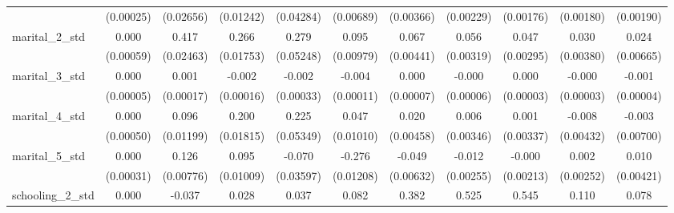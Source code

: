 {\begin{tabular}{l*{10}{c}}
                    &   (0.00025)         &   (0.02656)         &   (0.01242)         &   (0.04284)         &   (0.00689)         &   (0.00366)         &   (0.00229)         &   (0.00176)         &   (0.00180)         &   (0.00190)         \\
marital\_2\_std       &       0.000         &       0.417\sym{***}&       0.266\sym{***}&       0.279\sym{***}&       0.095\sym{***}&       0.067\sym{***}&       0.056\sym{***}&       0.047\sym{***}&       0.030\sym{***}&       0.024\sym{***}\\
                    &   (0.00059)         &   (0.02463)         &   (0.01753)         &   (0.05248)         &   (0.00979)         &   (0.00441)         &   (0.00319)         &   (0.00295)         &   (0.00380)         &   (0.00665)         \\
marital\_3\_std       &       0.000         &       0.001\sym{***}&      -0.002\sym{***}&      -0.002\sym{***}&      -0.004\sym{***}&       0.000\sym{*}  &      -0.000         &       0.000         &      -0.000\sym{***}&      -0.001\sym{***}\\
                    &   (0.00005)         &   (0.00017)         &   (0.00016)         &   (0.00033)         &   (0.00011)         &   (0.00007)         &   (0.00006)         &   (0.00003)         &   (0.00003)         &   (0.00004)         \\
marital\_4\_std       &       0.000         &       0.096\sym{***}&       0.200\sym{***}&       0.225\sym{***}&       0.047\sym{***}&       0.020\sym{***}&       0.006         &       0.001         &      -0.008         &      -0.003         \\
                    &   (0.00050)         &   (0.01199)         &   (0.01815)         &   (0.05349)         &   (0.01010)         &   (0.00458)         &   (0.00346)         &   (0.00337)         &   (0.00432)         &   (0.00700)         \\
marital\_5\_std       &       0.000         &       0.126\sym{***}&       0.095\sym{***}&      -0.070         &      -0.276\sym{***}&      -0.049\sym{***}&      -0.012\sym{***}&      -0.000         &       0.002         &       0.010\sym{*}  \\
                    &   (0.00031)         &   (0.00776)         &   (0.01009)         &   (0.03597)         &   (0.01208)         &   (0.00632)         &   (0.00255)         &   (0.00213)         &   (0.00252)         &   (0.00421)         \\
schooling\_2\_std     &       0.000         &      -0.037\sym{*}  &       0.028         &       0.037\sym{***}&       0.082\sym{***}&       0.382\sym{***}&       0.525\sym{***}&       0.545\sym{***}&       0.110\sym{***}&       0.078\sym{***}\\

\end{tabular}}
